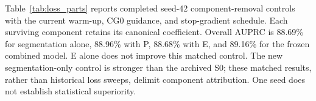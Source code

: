 
Table~\ref{tab:loss_parts} reports completed seed-42 component-removal controls with the current warm-up, CG0 guidance, and stop-gradient schedule. Each surviving component retains its canonical coefficient. Overall AUPRC is 88.69\% for segmentation alone, 88.96\% with P, 88.68\% with E, and 89.16\% for the frozen combined model. E alone does not improve this matched control. The new segmentation-only control is stronger than the archived S0; these matched results, rather than historical loss sweeps, delimit component attribution. One seed does not establish statistical superiority.


